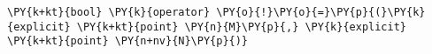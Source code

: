 \begin{Verbatim}[commandchars=\\\{\}]
    \PY{k+kt}{bool} \PY{k}{operator} \PY{o}{!}\PY{o}{=}\PY{p}{(}\PY{k}{explicit} \PY{k+kt}{point} \PY{n}{M}\PY{p}{,} \PY{k}{explicit} \PY{k+kt}{point} \PY{n+nv}{N}\PY{p}{)}
\end{Verbatim}
